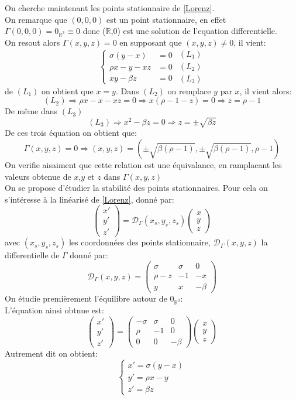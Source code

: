 \documentclass{article}
\newcommand*\colv[1]{
\left(\begin{array}{c}
    #1
\end{array}\right)
}
\newcommand{\R}{\mathbb{R}}
\begin{document}
On cherche maintenant les points stationnaire de \eqref{Lorenz}.\\
On remarque que $(0,0,0)$ est un point stationnaire, en effet $\Gamma(0,0,0) = 0_{\R^3} \equiv 0$ donc ($\R$,0) est une solution de l'equation differentielle.\\
On resout alors $\Gamma(x,y,z)=0$ en supposant que $(x,y,z) \neq 0$, il vient:
\[
\left\{\begin{array}{rl} %
     \sigma(y-x)&=0  \\
     \rho x -y -xz&=0\\
     xy - \beta z&=0
\end{array}\right.
\begin{array}{c} %
    (L_1)\\
    (L_2)\\
    (L_3)
\end{array}
\]
de $(L_1)$ on obtient que $x=y$. Dans $(L_2)$ on remplace $y$ par $x$, il vient alors:
\[
    (L_2) \Rightarrow \rho x - x - xz = 0 \Rightarrow x (\rho -1 -z ) = 0 \Rightarrow z = \rho -1
\]
De m\^eme dans $(L_3)$
\[
    (L_3) \Rightarrow x^2 - \beta z = 0 \Rightarrow z = \pm \sqrt{\beta z}
\]
De ces trois équation on obtient que:\[
    \Gamma(x,y,z)=0 \Rightarrow (x,y,z) = (\pm \sqrt{ \beta (\rho -1)} ,\pm \sqrt{\beta (\rho -1)}, \rho -1)   
\]
On verifie aisaiment que cette relation est une \'equivalance, en ramplacant les valeurs obtenue de $x$,$y$ et $z$ dans $\Gamma(x,y,z)$\\
On se propose d'étudier la stabilité des points stationnaires. Pour cela on s'intéresse à la linéarisé de \eqref{Lorenz}, donné par:
\[
\colv{x'\\y'\\z'} = \mathcal{D}_{\Gamma}(x_s,y_s,z_s)\colv{x\\y\\z}    
\]
avec $(x_s,y_s,z_s)$ les coordonnées des points stationnaire, $\mathcal{D}_{\Gamma}(x,y,z)$ la differentielle de $\Gamma$ donné par:
\[
\mathcal{D}_{\Gamma}(x,y,z) =
\begin{pmatrix}
    \sigma & \sigma & 0 \\ \rho - z & -1 & -x \\ y & x & - \beta
\end{pmatrix}
\]
On étudie premièrement l'équilibre autour de $0_{\R^3}$:\\
L'équation ainsi obtnue est:
\begin{equation}
    \colv{x'\\y'\\z'} =
    \begin{pmatrix}
        - \sigma & \sigma & 0 \\ \rho & -1 & 0 \\ 0 & 0 & - \beta
    \end{pmatrix}
    \colv{x \\ y \\ z}
\end{equation}
Autrement dit on obtient:
\begin{equation}
    \left\{\begin{array}{lr}
        x' = \sigma (y-x) \\
        y' = \rho x - y \\
        z' = \beta z
    \end{array}\right.
\end{equation}
\end{document}
